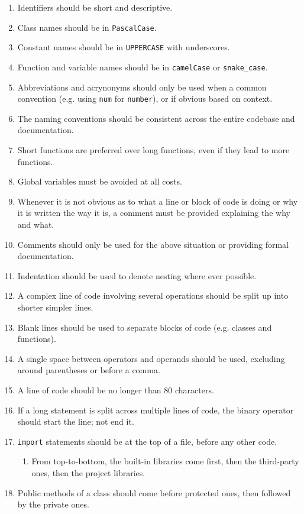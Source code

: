 \documentclass[11pt]{article}
\begin{document}
\begin{enumerate}
    \item Identifiers should be short and descriptive.
    \item Class names should be in \texttt{PascalCase}.
    \item Constant names should be in \texttt{UPPERCASE} with underscores.
    \item Function and variable names should be in \texttt{camelCase} or \texttt{snake\_case}.
    \item Abbreviations and acrynonyms should only be used when a common convention (e.g. using \texttt{num} for \texttt{number}), or if obvious based on context.
    \item The naming conventions should be consistent across the entire codebase and documentation.
    \item Short functions are preferred over long functions, even if they lead to more functions.
    \item Global variables must be avoided at all costs.
    \item Whenever it is not obvious as to what a line or block of code is doing or why it is written the way it is, a comment must be provided explaining the why and what.
    \item Comments should only be used for the above situation or providing formal documentation.
    \item Indentation should be used to denote nesting where ever possible.
    \item A complex line of code involving several operations should be split up into shorter simpler lines.
    \item Blank lines should be used to separate blocks of code (e.g. classes and functions).
    \item A single space between operators and operands should be used, excluding around parentheses or before a comma.
    \item A line of code should be no longer than 80 characters.
    \item If a long statement is split across multiple lines of code, the binary operator should start the line; not end it.
    \item \texttt{import} statements should be at the top of a file, before any other code.
    \begin{enumerate}
        \item From top-to-bottom, the built-in libraries come first, then the third-party ones, then the project libraries.
    \end{enumerate}
    \item Public methods of a class should come before protected ones, then followed by the private ones.
\end{enumerate}
\end{document}
